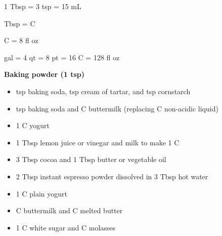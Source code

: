 
1 Tbsp = 3 tsp = 15 mL

 Tbsp = \quart C

 C = 8 fl oz

 gal = 4 qt = 8 pt = 16 C = 128 fl oz

{\bf Baking powder (1 tsp)}\begin{itemize} \itemsep0pt
\item\quart tsp baking soda, \half tsp cream of tartar, and \quart tsp cornstarch
\item\quart tsp baking soda and \half C buttermilk (replacing \half C non-acidic liquid)
\end{itemize}

\begin{itemize} \itemsep0pt
\item 1 C yogurt
\item 1 Tbsp lemon juice or vinegar and milk to make 1 C
\end{itemize}

\begin{itemize} \itemsep0pt
\item 3 Tbsp cocoa and 1 Tbsp butter or vegetable oil
\end{itemize}

\begin{itemize} \itemsep0pt
\item 2 Tbsp instant espresso powder dissolved in 3 Tbsp hot water
\end{itemize}


\begin{itemize} \itemsep0pt
\item 1 C plain yogurt
\item \tquart C buttermilk and \third C melted butter
\end{itemize}

\begin{itemize} \itemsep0pt
\item1 C white sugar and \quart C molasses
\end{itemize}

